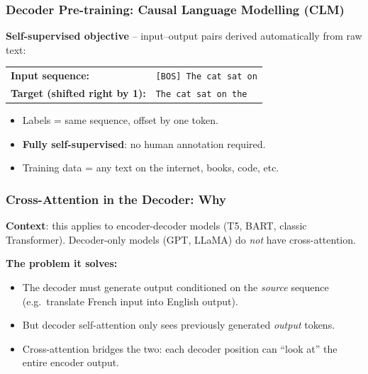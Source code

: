 \begin{frame}[fragile]\frametitle{Decoder Pre-training: Causal Language Modelling (CLM)}
\textbf{Self-supervised objective} – input–output pairs derived automatically from raw text:

\vspace{0.3em}
\begin{center}
\begin{tabular}{ll}
\textbf{Input sequence:}  & \texttt{[BOS] The cat sat on} \\
\textbf{Target (shifted right by 1):} & \texttt{The cat sat on the} \\
\end{tabular}
\end{center}

\begin{itemize}
\item Labels = same sequence, offset by one token.
\item \textbf{Fully self-supervised}: no human annotation required.
\item Training data = any text on the internet, books, code, etc.
\end{itemize}
\end{frame}

\begin{frame}[fragile]\frametitle{Cross-Attention in the Decoder: Why }
\textbf{Context}: this applies to encoder-decoder models (T5, BART, classic Transformer).
Decoder-only models (GPT, LLaMA) do \emph{not} have cross-attention.

\vspace{0.4em}
\textbf{The problem it solves:}
\begin{itemize}
\item The decoder must generate output conditioned on the \emph{source} sequence
      (e.g.\ translate French input into English output).
\item But decoder self-attention only sees previously generated \emph{output} tokens.
\item Cross-attention bridges the two: each decoder position can ``look at'' the
      entire encoder output.
\end{itemize}

\end{frame}

